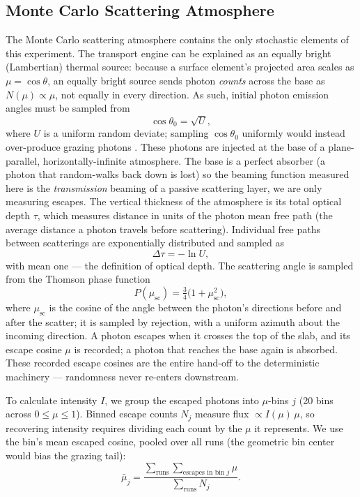 \documentclass[twocolumn]{aastex701}
\begin{document}
\subsection{Monte Carlo Scattering Atmosphere} \label{sec:methods-mc}
The Monte Carlo scattering atmosphere contains the only stochastic elements of this
experiment. The transport engine can be explained as an equally bright (Lambertian) thermal
source: because a surface element's projected area scales as $\mu = \cos\theta$, an equally
bright source sends photon \emph{counts} across the base as $N(\mu) \propto \mu$, not
equally in every direction.
As such, initial photon emission angles must be sampled from
\begin{equation}
    \cos\theta_0 = \sqrt{U}, \label{eq:injection}
\end{equation}
where $U$ is a uniform random deviate; sampling $\cos\theta_0$ uniformly would instead
over-produce grazing photons \citep{Cashwell1959,Whitney2011}. These photons are injected at
the base of a plane-parallel, horizontally-infinite atmosphere. The base is a perfect
absorber (a photon that random-walks back down is lost) so the beaming function measured
here is the \emph{transmission} beaming of a passive scattering layer, we are only measuring
escapes.
The vertical thickness of the atmosphere is its total optical depth $\tau$, which measures
distance in units of the photon mean free path (the average distance a photon travels before
scattering). Individual free paths between scatterings are exponentially distributed and
sampled as
\begin{equation}
    \Delta\tau = -\ln U, \label{eq:step}
\end{equation}
with mean one --- the definition of optical depth.
The scattering angle is sampled from the Thomson phase function \citep{Chandrasekhar1960}
\begin{equation}
    P(\mu_{\text{sc}}) = \tfrac{3}{4}\big(1 + \mu_{\text{sc}}^2\big), \label{eq:thomson}
\end{equation}
where $\mu_{\text{sc}}$ is the cosine of the angle between the photon's directions before
and after the scatter; it is sampled by rejection, with a uniform azimuth about the incoming
direction. A photon escapes when it crosses the top of the slab, and its escape cosine $\mu$
is recorded; a photon that reaches the base again is absorbed. These recorded escape cosines
are the entire hand-off to the deterministic machinery --- randomness never re-enters
downstream.

To calculate intensity $I$, we group the escaped photons into $\mu$-bins $j$ (20 bins across
$0 \le \mu \le 1$). Binned escape counts $N_j$ measure flux $\propto I(\mu)\,\mu$, so
recovering intensity requires dividing each count by the $\mu$ it represents. We use the
bin's mean escaped cosine, pooled over all runs (the geometric bin center would bias the
grazing tail):
\begin{equation}
\bar\mu_j = \frac{\sum_{\text{runs}} \sum_{\text{escapes in bin } j} \mu}{\sum_{\text{runs}}
    N_j}. \label{eq:mubar}
\end{equation}
\end{document}
